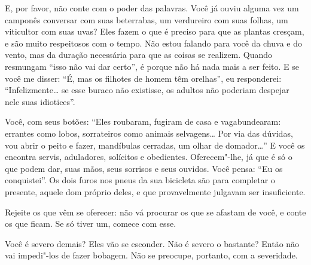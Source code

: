 \bigskip
\bigskip

E, por favor, não conte com o poder das palavras. Você já ouviu alguma
vez um camponês conversar com suas beterrabas, um verdureiro com suas
folhas, um viticultor com suas uvas? Eles fazem o que é preciso para que
as plantas cresçam, e são muito respeitosos com o tempo. Não estou
falando para você da chuva e do vento, mas da duração necessária para
que as coisas se realizem. Quando resmungam ``isso não vai dar certo'',
é porque não há nada mais a ser feito. E se você me disser: ``É, mas os
filhotes de homem têm orelhas'', eu responderei: ``Infelizmente\ldots{} se
esse buraco não existisse, os adultos não poderiam despejar nele suas
idiotices''.

\bigskip
\bigskip


Você, com seus botões: ``Eles roubaram, fugiram de casa e vagabundearam:
errantes como lobos, sorrateiros como animais selvagens\ldots{} Por via das
dúvidas, vou abrir o peito e fazer, mandíbulas cerradas, um olhar de
domador\ldots{}'' E você os encontra servis, aduladores, solícitos e
obedientes. Oferecem"-lhe, já que é só o que podem dar, suas mãos, seus
sorrisos e seus ouvidos. Você pensa: ``Eu os conquistei''. Os dois furos
nos pneus da sua bicicleta são para completar o presente, aquele dom
próprio deles, e que provavelmente julgavam ser insuficiente.

\bigskip
\bigskip


Rejeite os que vêm se oferecer: não vá procurar os que se afastam de
você, e conte os que ficam. Se só tiver um, comece com esse.

\bigskip
\bigskip


Você é severo demais? Eles vão se esconder. Não é severo o bastante?
Então não vai impedi"-los de fazer bobagem. Não se preocupe, portanto,
com a severidade.


\bigskip
\bigskip


\pagebreak
\thispagestyle{empty}

